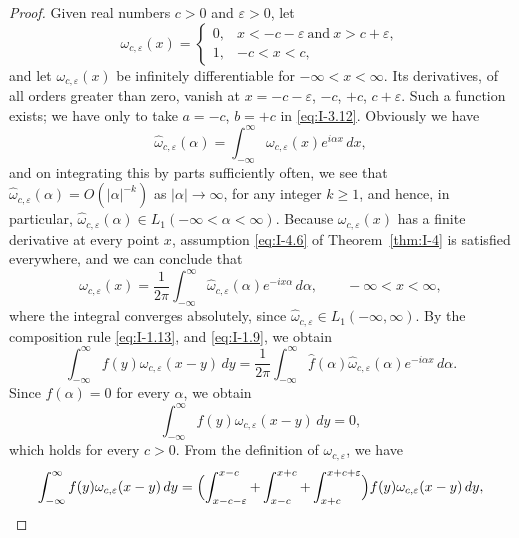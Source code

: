 \begin{proof}
Given real numbers $c>0$ and $\varepsilon>0$, let
\begin{equation*}
\omega_{c,\varepsilon}(x)=
\begin{cases}
0,&x<-c-\varepsilon\ \text{and}\ x>c+\varepsilon,\\
1,& -c<x<c,
\end{cases}
\end{equation*}
and let $\omega_{c,\varepsilon}(x)$ be infinitely differentiable for $-\infty<x<\infty$. Its derivatives, of all orders greater than zero, vanish at $x=-c-\varepsilon$, $-c$, $+c$, $c+\varepsilon$. Such a function exists; we have only to take $a=-c$, $b=+c$ in \eqref{eq:I-3.12}. Obviously we have
\begin{equation*}
\hat\omega_{c,\varepsilon}(\alpha)=\int_{-\infty}^{\infty}\omega_{c,\varepsilon}(x)e^{i\alpha x}\,dx,
\end{equation*}
and on integrating this by parts sufficiently often, we see that $\hat\omega_{c,\varepsilon}(\alpha)=O(|\alpha|^{-k})$ as $|\alpha|\to\infty$, for any integer $k\ge 1$, and hence, in particular, $\hat\omega_{c,\varepsilon}(\alpha)\in L_1(-\infty<\alpha<\infty)$. Because $\omega_{c,\varepsilon}(x)$ has a finite derivative at every point $x$, assumption \eqref{eq:I-4.6} of Theorem~\ref{thm:I-4} is satisfied everywhere, and we can conclude that
\begin{equation*}
\omega_{c,\varepsilon}(x)=\frac{1}{2\pi}\int_{-\infty}^{\infty}\hat\omega_{c,\varepsilon}(\alpha)e^{-ix\alpha}\,d\alpha,
\qquad-\infty<x<\infty,
\end{equation*}
where the integral converges absolutely, since $\hat\omega_{c,\varepsilon}\in L_1(-\infty,\infty)$. By the composition rule \eqref{eq:I-1.13}, and \eqref{eq:I-1.9}, we obtain
\begin{equation*}
\int_{-\infty}^{\infty}f(y)\omega_{c,\varepsilon}(x-y)\,dy
=\frac{1}{2\pi}\int_{-\infty}^{\infty}\hat f(\alpha)\hat\omega_{c,\varepsilon}(\alpha)e^{-i\alpha x}\,d\alpha.
\end{equation*}
Since $\hat f(\alpha)=0$ for every $\alpha$, we obtain
\begin{equation}\label{eq:I-6.1}
\int_{-\infty}^{\infty}f(y)\omega_{c,\varepsilon}(x-y)\,dy=0,
\end{equation}
which holds for every $c>0$. From the definition of $\omega_{c,\varepsilon}$, we have
\begin{equation*}
\int_{-\infty}^{\infty}f(y)\omega_{c,\varepsilon}(x-y)\,dy
=\Bigl(\int_{x-c-\varepsilon}^{x-c}+\int_{x-c}^{x+c}+\int_{x+c}^{x+c+\varepsilon}\Bigr)f(y)\omega_{c,\varepsilon}(x-y)\,dy,

\end{equation*}
\end{proof}
